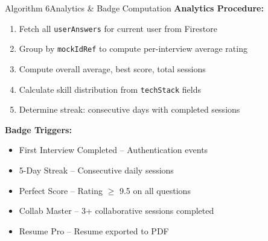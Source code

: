 \documentclass{beamer}
\begin{document}
\begin{frame}{Algorithm 6}{Analytics \& Badge Computation}
\textbf{Analytics Procedure:}
\begin{enumerate}
    \item Fetch all \texttt{userAnswers} for current user from Firestore
    \item Group by \texttt{mockIdRef} to compute per-interview average rating
    \item Compute overall average, best score, total sessions
    \item Calculate skill distribution from \texttt{techStack} fields
    \item Determine streak: consecutive days with completed sessions
\end{enumerate}

\vspace{3pt}
\textbf{Badge Triggers:}
\begin{itemize}
    \item First Interview Completed -- Authentication events
    \item 5-Day Streak -- Consecutive daily sessions
    \item Perfect Score -- Rating $\geq$ 9.5 on all questions
    \item Collab Master -- 3+ collaborative sessions completed
    \item Resume Pro -- Resume exported to PDF
\end{itemize}
\end{frame}

\end{document}
